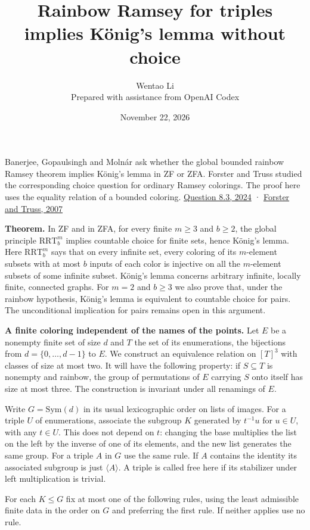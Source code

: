 \documentclass[11pt]{article}
\author{Wentao Li\\\small Prepared with assistance from OpenAI Codex}
\date{November 22, 2026}
\title{Rainbow Ramsey for triples implies König's lemma without choice}
\begin{document}
\maketitle
Banerjee, Gopaulsingh and Molnár ask whether the global bounded rainbow Ramsey theorem implies König's lemma in ZF or ZFA. Forster and Truss studied the corresponding choice question for ordinary Ramsey colorings. The proof here uses the equality relation of a bounded coloring. \href{https://arxiv.org/abs/2401.02215}{Question 8.3, 2024} · \href{https://doi.org/10.1007/s00153-006-0025-z}{Forster and Truss, 2007}

\textbf{Theorem.} In ZF and in ZFA, for every finite \(m\ge3\) and \(b\ge2\), the global principle \(\mathrm{RRT}^m_b\) implies countable choice for finite sets, hence König's lemma. Here \(\mathrm{RRT}^m_b\) says that on every infinite set, every coloring of its \(m\)-element subsets with at most \(b\) inputs of each color is injective on all the \(m\)-element subsets of some infinite subset. König's lemma concerns arbitrary infinite, locally finite, connected graphs. For \(m=2\) and \(b\ge3\) we also prove that, under the rainbow hypothesis, König's lemma is equivalent to countable choice for pairs. The unconditional implication for pairs remains open in this argument.

\textbf{A finite coloring independent of the names of the points.} Let \(E\) be a nonempty finite set of size \(d\) and \(T\) the set of its enumerations, the bijections from \(d=\{0,\ldots,d-1\}\) to \(E\). We construct an equivalence relation on \([T]^3\) with classes of size at most two. It will have the following property: if \(S\subseteq T\) is nonempty and rainbow, the group of permutations of \(E\) carrying \(S\) onto itself has size at most three. The construction is invariant under all renamings of \(E\).

Write \(G=\mathrm{Sym}(d)\) in its usual lexicographic order on lists of images. For a triple \(U\) of enumerations, associate the subgroup \(K\) generated by \(t^{-1}u\) for \(u\in U\), with any \(t\in U\). This does not depend on \(t\): changing the base multiplies the list on the left by the inverse of one of its elements, and the new list generates the same group. For a triple \(A\) in \(G\) use the same rule. If \(A\) contains the identity its associated subgroup is just \(\langle A\rangle\). A triple is called free here if its stabilizer under left multiplication is trivial.

For each \(K\le G\) fix at most one of the following rules, using the least admissible finite data in the order on \(G\) and preferring the first rule. If neither applies use no rule.
\end{document}
